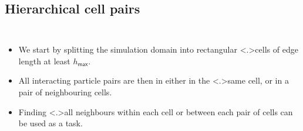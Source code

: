 \documentclass{beamer}
\begin{document}
    
    \subsection{Hierarchical cell pairs}
    
    \begin{frame}
    
        \pause

        \begin{columns}
        
            \begin{itemize}

                \item<+-> We start by splitting the simulation domain into
                    rectangular \alert<.>{cells} of edge length at least
                    $h_\mathsf{max}$.
                    
                \item<+-> All interacting particle pairs are then in either
                    in the \alert<.>{same cell}, or in a
                    \alert<+>{pair of neighbouring cells}.
                    
                \item<+-> Finding \alert<.>{all neighbours} within each cell
                    or between each
                    pair of cells can be used as a \alert<+>{task}.
                    
            \end{itemize}
            
         
        \end{columns}
    \end{frame}
    
\end{document}
